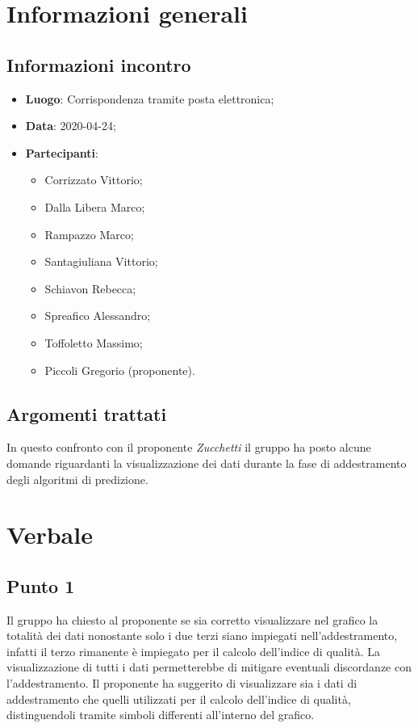 \section{Informazioni generali}
    \subsection{Informazioni incontro}
        \begin{itemize}
            \item \textbf{Luogo}: Corrispondenza tramite posta elettronica;
            \item \textbf{Data}: 2020-04-24;
            \item \textbf{Partecipanti}: 
            \begin{itemize}
            	\item Corrizzato Vittorio;
                \item Dalla Libera Marco;
                \item Rampazzo Marco;
                \item Santagiuliana Vittorio;
                \item Schiavon Rebecca;
                \item Spreafico Alessandro;
                \item Toffoletto Massimo;
                \item Piccoli Gregorio (proponente).
            \end{itemize}
        \end{itemize}
    \subsection{Argomenti trattati}
        In questo confronto con il proponente \textit{Zucchetti} il gruppo ha posto alcune domande riguardanti la visualizzazione dei dati durante la fase di addestramento degli algoritmi di predizione.
\section{Verbale}
    \subsection{Punto 1}
        Il gruppo ha chiesto al proponente se sia corretto visualizzare nel grafico la totalità dei dati nonostante solo i due terzi siano impiegati nell'addestramento, infatti il terzo rimanente è impiegato per il calcolo dell'indice di qualità.
        La visualizzazione di tutti i dati permetterebbe di mitigare eventuali discordanze con l'addestramento.
        Il proponente ha suggerito di visualizzare sia i dati di addestramento che quelli utilizzati per il calcolo dell'indice di qualità, distinguendoli tramite simboli differenti all'interno del grafico.
